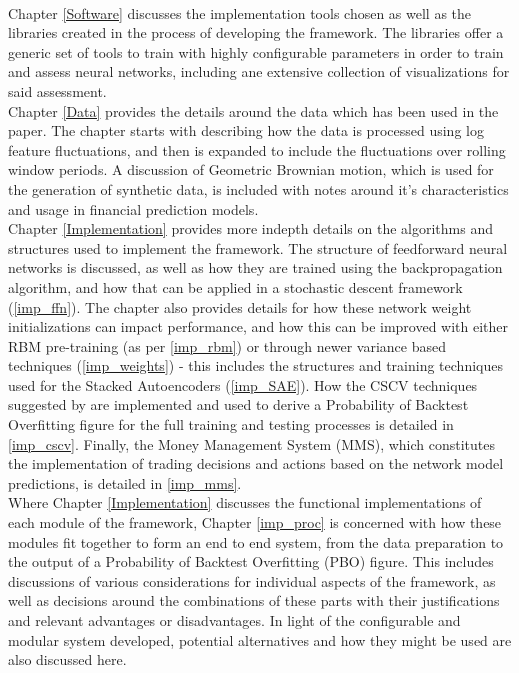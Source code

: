 \documentclass[a4paper,11pt,oneside]{article}
\theoremstyle{plain}
\theoremstyle{definition}
\begin{document}
~\\\newline
Chapter \ref{Software} discusses the implementation tools chosen as well as the libraries created in the process of developing the framework. The libraries offer a generic set of tools to train with highly configurable parameters in order to train and assess neural networks, including ane extensive collection of visualizations for said assessment.
~\\\newline
Chapter \ref{Data} provides the details around the data which has been used in the paper. The chapter starts with describing how the data is processed using log feature fluctuations, and then is expanded to include the fluctuations over rolling window periods. A discussion of Geometric Brownian motion, which is used for the generation of synthetic data, is included with notes around it's characteristics and usage in financial prediction models.
~\\\newline
Chapter \ref{Implementation} provides more indepth details on the algorithms and structures used to implement the framework. The structure of feedforward neural networks is discussed, as well as how they are trained using the backpropagation algorithm, and how that can be applied in a stochastic descent framework (\ref{imp_ffn}). The chapter also provides details for how these network weight initializations can impact performance, and how this can be improved with either RBM pre-training (as per \ref{imp_rbm}) or through newer variance based techniques (\ref{imp_weights}) - this includes the structures and training techniques used for the Stacked Autoencoders (\ref{imp_SAE}). How the CSCV techniques suggested by \cite{BailyPBO} are implemented and used to derive a Probability of Backtest Overfitting figure for the full training and testing processes is detailed in \ref{imp_cscv}. Finally, the Money Management System (MMS), which constitutes the implementation of trading decisions and actions based on the network model predictions, is detailed in \ref{imp_mms}.
~\\\newline
Where Chapter \ref{Implementation} discusses the functional implementations of each module of the framework, Chapter \ref{imp_proc} is concerned with how these modules fit together to form an end to end system, from the data preparation to the output of a Probability of Backtest Overfitting (PBO) figure. This includes discussions of various considerations for individual aspects of the framework, as well as decisions around the combinations of these parts with their justifications and relevant advantages or disadvantages. In light of the configurable and modular system developed, potential alternatives and how they might be used are also discussed here.
\end{document}
